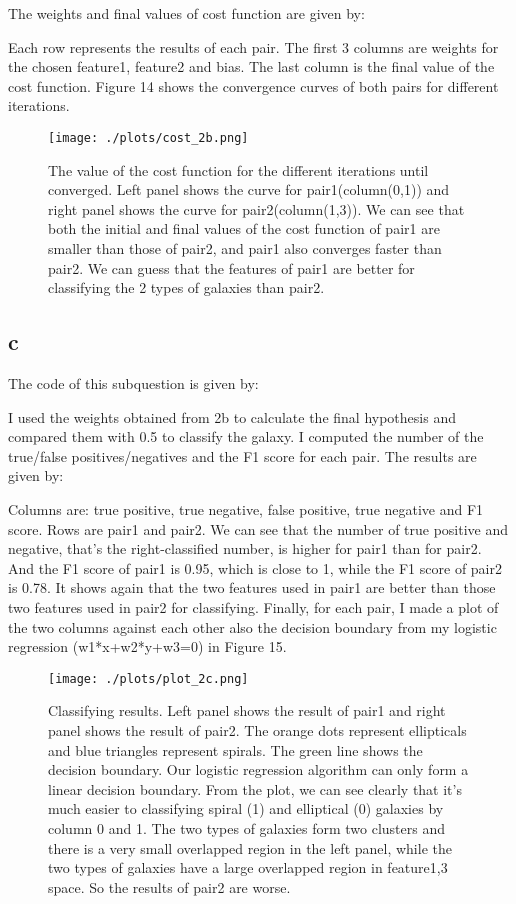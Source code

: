 The weights and final values of cost function are given by:

Each row represents the results of each pair. The first 3 columns are weights for the chosen feature1, feature2 and bias. The last column is the final value of the cost function. Figure 14 shows the convergence curves of both pairs for different iterations.\\

\begin{figure}[h!]
  \centering
  \texttt{[image: ./plots/cost\_2b.png]}
  \caption{The value of the cost function for the different iterations until converged. Left panel shows the curve for pair1(column(0,1)) and right panel shows the curve for pair2(column(1,3)). We can see that both the initial and final values of the cost function of pair1 are smaller than those of pair2, and pair1 also converges faster than pair2. We can guess that the features of pair1 are better for classifying the 2 types of galaxies than pair2.}
  \label{fig14}
\end{figure}

\subsection{c}
The code of this subquestion is given by:

I used the weights obtained from 2b to calculate the final hypothesis and compared them with 0.5 to classify the galaxy. I computed the number of the true/false positives/negatives and the F1 score for each pair. The results are given by:

Columns are: true positive, true negative, false positive, true negative and F1 score. Rows are pair1 and pair2. We can see that the number of true positive and negative, that's the right-classified number, is higher for pair1 than for pair2. And the F1 score of pair1 is 0.95, which is close to 1, while the F1 score of pair2 is 0.78. It shows again that the two features used in pair1 are better than those two features used in pair2 for classifying. Finally, for each pair, I made a plot of the two columns against each other also the decision boundary from my logistic regression (w1*x+w2*y+w3=0) in Figure 15.\\

\begin{figure}[h!]
  \centering
  \texttt{[image: ./plots/plot\_2c.png]}
  \caption{Classifying results. Left panel shows the result of pair1 and right panel shows the result of pair2. The orange dots represent ellipticals and blue triangles represent spirals. The green line shows the decision boundary. Our logistic regression algorithm can only form a linear decision boundary.  From the plot, we can see clearly that it's much easier to classifying spiral (1) and elliptical (0) galaxies by column 0 and 1. The two types of galaxies form two clusters and there is a very small overlapped region in the left panel, while the two types of galaxies have a large overlapped region in feature1,3 space. So the results of pair2 are worse.}
  \label{fig15}
\end{figure}

